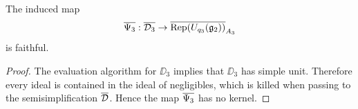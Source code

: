 \begin{lemma}\label{lem:faithful}
    The induced map
    \[
        \overline{\Psi_3} : \overline{\mathcal{D}_3} \to \overline{\operatorname{Rep}(U_{q_3}(\mathfrak{g}_2))}_{A_3} 
    \]
    is faithful.
\end{lemma}
\begin{proof}
    The evaluation algorithm for $\DD_3$ implies that $\DD_3$ has simple unit. Therefore every ideal is contained in the ideal of negligibles, which is killed when passing to the semisimplification $\overline{\mathcal{D}}$. Hence the map $\overline{\Psi_3}$ has no kernel.
\end{proof}

\begin{comment}
    
\begin{proof}[Proof of Theorem~\ref{thm:level-3}]
    We now note that since $\GG_2(q)$ and $\DD_3$ are unitary, we know that $\GG_2(q) \hookrightarrow \DD_3$ induces a $\dagger$-embedding $\ol{\GG_2(q)} \hookrightarrow \ol{\DD_3}$. Thus, there is a chain
    \[
        \ol{\GG_2(q_3)} \hookrightarrow \ol{\DD_3} \xhookrightarrow{\ol{\Psi_3}} \ol{\Rep(U_{q_3}(\gg_2))}_{A_3}
    \] 
    of faithful dominant functors. Using the universal property of Karoubi completion, we arrive at the commutative diagram
    \[
        \xymatrix@R=40pt@C=65pt{
        \ol{\GG_2(q_3)} \ar@{^{(}->}[r] \ar@{^{(}->}[d] & \ol{\DD_3} \ar@{^{(}->}[dr]^{\ol{\Psi}} \ar@{^{(}->}[d] & \\
        \ol{\Rep(U_{q_3}(\gg_2))} \ar[r]^{\FF_1} & \Ab(\ol{\DD_3}) \ar[r]^{\FF_2} & \ol{\Rep(U_{q_3}(\gg_2))}_{A_3} \\
        }
    \]
    where $\FF_1$ and $\FF_2$ are the induced functors. At this point we shift our focus to the lower layer of the diagram.
    
    By \cite{},  $(\FF_2 \circ \FF_1)|_{\ol{\GG_2(q_3)}} = \FF_{A_3}|_{\ol{\GG_2(q_3)}}$ implies $\FF_2 \circ \FF_1 = \FF_{A_3}$. 
    Note that both $\ol{\Rep(U_{q_3}(\gg_2))}$ and $\Ab(\ol{\DD_3})$ are semisimple, and therefore $\FF_1$ has a lax-monoidal right adjoint $\FF_1^\vee$. 
    Proposition~\ref{prop:exact-functor} now allows us to conjure $K$ and $B$ such that the following diagram commutes up to natural isomorphism:
    \[
        \xymatrix@R=40pt@C=65pt{
        \ol{\Rep(U_{q_3}(\gg_2))} \ar[r]^{\FF_1} \ar[dr]_{\FF_B} & \Ab(\ol{\DD_3}) \ar[r]^{\FF_2} \ar[d]^{K} & \ol{\Rep(U_q(\gg_2))}_A \\
        & \ol{\Rep(U_q(\gg_2))}_B \ar[ur]_{\FF'} & \\
        }
    \]
    Here, $\FF'$ is defined to complete the diagram. From here, apply $\FF_B^\vee$ to the containment $\unit \subseteq \FF'^\vee(\unit)$:
    \begin{align*}
        B & = \FF_B^\vee(\unit) \subseteq \FF_B^\vee \circ \FF'^\vee(\unit) \\
        & \cong (\FF_2 \circ \FF_1)^\vee (\unit) \\
        & = \FF_{A_3}^\vee(\unit) \\
        & = \FF_A^\vee(A_3) = A_3.
    \end{align*}
    

\end{comment}
